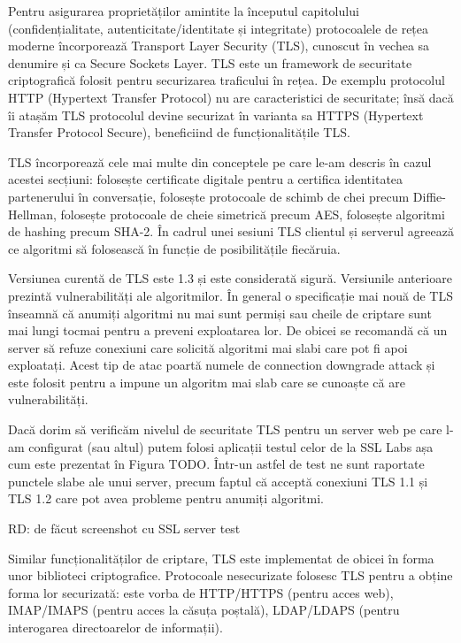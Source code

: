 Pentru asigurarea proprietăților amintite la începutul capitolului (confidențialitate, autenticitate/identitate și integritate) protocoalele de rețea moderne încorporează Transport Layer Security (TLS), cunoscut în vechea sa denumire și ca Secure Sockets Layer. TLS este un framework de securitate criptografică folosit pentru securizarea traficului în rețea. De exemplu protocolul HTTP (Hypertext Transfer Protocol) nu are caracteristici de securitate; însă dacă îi atașăm TLS protocolul devine securizat în varianta sa HTTPS (Hypertext Transfer Protocol Secure), beneficiind de funcționalitățile TLS.

TLS încorporează cele mai multe din conceptele pe care le-am descris în cazul acestei secțiuni: folosește certificate digitale pentru a certifica identitatea partenerului în conversație, folosește protocoale de schimb de chei precum Diffie-Hellman, folosește protocoale de cheie simetrică precum AES, folosește algoritmi de hashing precum SHA-2. În cadrul unei sesiuni TLS clientul și serverul agreează ce algoritmi să folosească în funcție de posibilitățile fiecăruia.

Versiunea curentă de TLS este 1.3 și este considerată sigură. Versiunile anterioare prezintă vulnerabilități ale algoritmilor. În general o specificație mai nouă de TLS înseamnă că anumiți algoritmi nu mai sunt permiși sau cheile de criptare sunt mai lungi tocmai pentru a preveni exploatarea lor. De obicei se recomandă că un server să refuze conexiuni care solicită algoritmi mai slabi care pot fi apoi exploatați. Acest tip de atac poartă numele de connection downgrade attack și este folosit pentru a impune un algoritm mai slab care se cunoaște că are vulnerabilități.

Dacă dorim să verificăm nivelul de securitate TLS pentru un server web pe care l-am configurat (sau altul) putem folosi aplicații testul celor de la SSL Labs așa cum este prezentat în Figura TODO. Într-un astfel de test ne sunt raportate punctele slabe ale unui server, precum faptul că acceptă conexiuni TLS 1.1 și TLS 1.2 care pot avea probleme pentru anumiți algoritmi.

RD: de făcut screenshot cu SSL server test

Similar funcționalităților de criptare, TLS este implementat de obicei în forma unor biblioteci criptografice. Protocoale nesecurizate folosesc TLS pentru a obține forma lor securizată: este vorba de HTTP/HTTPS (pentru acces web), IMAP/IMAPS (pentru acces la căsuța poștală), LDAP/LDAPS (pentru interogarea directoarelor de informații).

